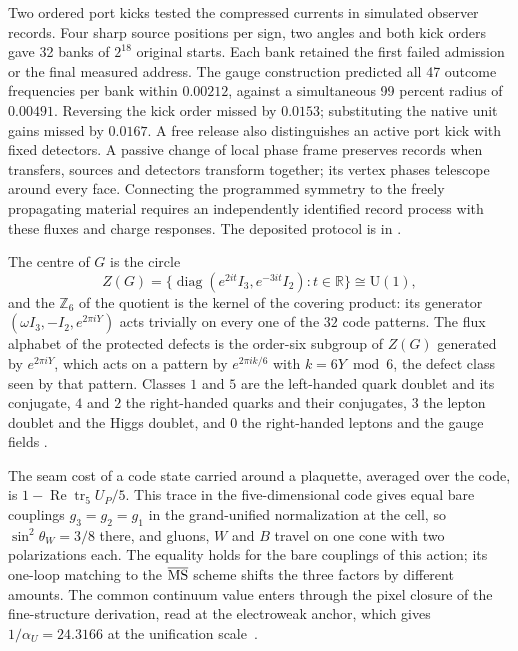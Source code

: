 \documentclass[11pt]{article}
\begin{document}
Two ordered port kicks tested the compressed currents in simulated
observer records. Four sharp source positions per sign, two angles and
both kick orders gave 32 banks of \(2^{18}\) original starts. Each bank
retained the first failed admission or the final measured address. The
gauge construction predicted all 47 outcome frequencies per bank within
\(0.00212\), against a simultaneous 99 percent radius of \(0.00491\).
Reversing the kick order missed by \(0.0153\); substituting the native
unit gains missed by \(0.0167\). A free release also distinguishes an
active port kick with fixed detectors. A passive change of local phase
frame preserves records when transfers, sources and detectors transform
together; its vertex phases telescope around every face. Connecting the
programmed symmetry to the freely propagating material requires an
independently identified record process with these fluxes and charge
responses. The deposited protocol is in
.

The centre of \(G\) is the circle
\[
 Z(G)=\{\operatorname{diag}(e^{2it}I_3,e^{-3it}I_2):t\in\mathbb R\}\cong\mathrm U(1),
\]
and the \(\mathbb Z_6\) of the quotient is the kernel of the covering product: its
generator \((\omega I_3,-I_2,e^{2\pi iY})\) acts trivially on every one of the \(32\)
code patterns. The flux alphabet of the protected defects is the order-six subgroup of
\(Z(G)\) generated by \(e^{2\pi iY}\), which acts on a pattern by \(e^{2\pi ik/6}\) with
\(k=6Y\bmod6\), the defect class seen by that pattern. Classes \(1\) and
\(5\) are the left-handed quark doublet and its conjugate, \(4\) and \(2\) the right-handed
quarks and their conjugates, \(3\) the lepton doublet and the Higgs doublet, and \(0\) the
right-handed leptons and the gauge fields \cite{ophparticles}.

The seam cost of a code state carried around a plaquette, averaged over the code, is
\(1-\operatorname{Re}\operatorname{tr}_5U_P/5\). This trace in the five-dimensional code
gives equal bare couplings \(g_3=g_2=g_1\) in the grand-unified normalization at the cell,
so \(\sin^2\theta_W=3/8\) there, and gluons, \(W\) and \(B\) travel on one cone with two
polarizations each. The equality holds for the bare couplings of this action; its
one-loop matching to the \(\overline{\rm MS}\) scheme shifts the three factors by
different amounts. The common continuum value enters through the pixel closure of the
fine-structure derivation, read at the electroweak anchor, which gives
\(1/\alpha_U=24.3166\) at the unification scale~\cite{ophalpha}.
\end{document}
